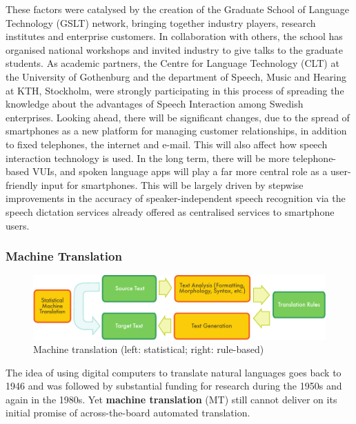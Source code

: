 \begin{multicols}{2}
These factors were
catalysed by the creation of the Graduate School of Language
Technology (GSLT) network, bringing together industry players,
research institutes and enterprise customers. In collaboration with
others, the school has organised national workshops and invited
industry to give talks to the graduate students. As academic partners,
the Centre for Language Technology (CLT) at the University of
Gothenburg and the department of Speech, Music and Hearing at KTH,
Stockholm, were strongly participating in this process of spreading
the knowledge about the advantages of Speech Interaction among Swedish
enterprises. Looking ahead, there will be significant changes, due to the spread of
smartphones as a new platform for managing customer relationships, in
addition to fixed telephones, the internet and e-mail. This will also
affect how speech interaction technology is used. In the long term,
there will be more telephone-based VUIs, and spoken language apps will
play a far more central role as a user-friendly input for
smartphones. This will be largely driven by stepwise improvements in
the accuracy of speaker-independent speech recognition via the speech
dictation services already offered as centralised services to
smartphone users.

\subsubsection{Machine Translation}

\begin{figure}[htb]
  \center
  \includegraphics[width=\textwidth]{../_media/english/machine_translation}
  \caption{Machine translation (left: statistical; right: rule-based)}
  \label{fig:mtarch_en}
\end{figure}


The idea of using digital computers to translate natural languages
goes back to 1946 and was followed by substantial funding for research
during the 1950s and again in the 1980s. Yet \textbf{machine
  translation} (MT) still cannot deliver on its initial promise of across-the-board automated translation. 


\end{multicols}
